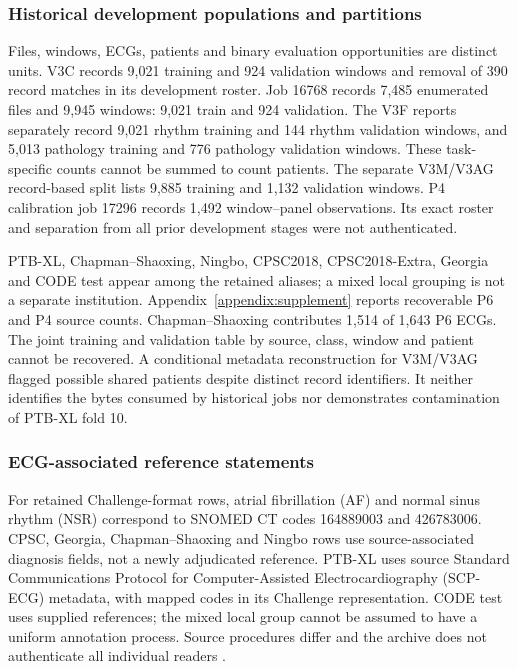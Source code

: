 \subsubsection{Historical development populations and partitions}
\label{sec:history}

Files, windows, ECGs, patients and binary evaluation opportunities are distinct units. V3C records 9,021 training and 924 validation windows and removal of 390 record matches in its development roster. Job 16768 records 7,485 enumerated files and 9,945 windows: 9,021 train and 924 validation. The V3F reports separately record 9,021 rhythm training and 144 rhythm validation windows, and 5,013 pathology training and 776 pathology validation windows. These task-specific counts cannot be summed to count patients. The separate V3M/V3AG record-based split lists 9,885 training and 1,132 validation windows. P4 calibration job 17296 records 1,492 window--panel observations. Its exact roster and separation from all prior development stages were not authenticated.

PTB-XL, Chapman--Shaoxing, Ningbo, CPSC2018, CPSC2018-Extra, Georgia and CODE test appear among the retained aliases; a mixed local grouping is not a separate institution. Appendix~\ref{appendix:supplement} reports recoverable P6 and P4 source counts. Chapman--Shaoxing contributes 1,514 of 1,643 P6 ECGs. The joint training and validation table by source, class, window and patient cannot be recovered. A conditional metadata reconstruction for V3M/V3AG flagged possible shared patients despite distinct record identifiers. It neither identifies the bytes consumed by historical jobs nor demonstrates contamination of PTB-XL fold 10.

\subsubsection{ECG-associated reference statements}
\label{sec:af-reference}

For retained Challenge-format rows, atrial fibrillation (AF) and normal sinus rhythm (NSR) correspond to SNOMED CT codes 164889003 and 426783006. CPSC, Georgia, Chapman--Shaoxing and Ningbo rows use source-associated diagnosis fields, not a newly adjudicated reference. PTB-XL uses source Standard Communications Protocol for Computer-Assisted Electrocardiography (SCP-ECG) metadata, with mapped codes in its Challenge representation. CODE test uses supplied references; the mixed local group cannot be assumed to have a uniform annotation process. Source procedures differ and the archive does not authenticate all individual readers \citep{Reyna2022Challenge,Wagner2020PTBXL}.

